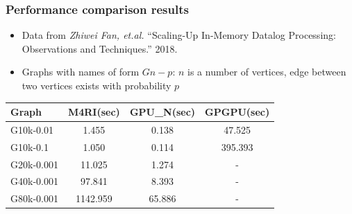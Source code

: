 \documentclass[xcolor=table]{beamer}
\begin{document}
\begin{frame}[fragile]
\frametitle{Performance comparison results}

\begin{itemize}
  \item Data from \emph{Zhiwei Fan, et.al.}  ``Scaling-Up In-Memory Datalog Processing: Observations and Techniques.'' 2018.
  \item Graphs with names of form $Gn-p$: $n$ is a number of vertices, edge between two vertices exists with probability $p$
\end{itemize}

\centering


{\setlength{\tabcolsep}{0.25em}
\begin{tabular}{ l | c | c | c  }

    Graph            & M4RI(sec)     & GPU\_N(sec) & GPGPU(sec)  \\
    \hline
    \hline
    \small{G10k-0.01}  & 1.455    & 0.138  & 47.525  \\
    \small{G10k-0.1}   & 1.050    & 0.114  & 395.393 \\
    \small{G20k-0.001} & 11.025   & 1.274  & -       \\
    \small{G40k-0.001} & 97.841   & 8.393  & -       \\
    \small{G80k-0.001} & 1142.959 & 65.886 & -       \\
  \end{tabular}

}

\end{frame}
\end{document}
